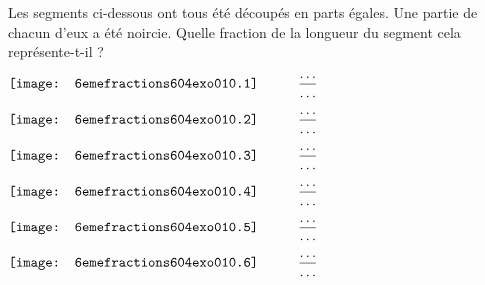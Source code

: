 Les segments ci-dessous ont tous été découpés en parts égales. Une partie de chacun d'eux a été noircie. Quelle fraction de la longueur du segment cela représente-t-il ?
\begin{myenumerate}
\setlength{\baselineskip}{4\baselineskip}
  \begin{multicols}{2}
  \item$\texttt{[image: 6emefractions604exo010.1]}\kern1cm\dfrac\ldots\ldots$
  \item$\texttt{[image: 6emefractions604exo010.2]}\kern1cm\dfrac\ldots\ldots$
  \item$\texttt{[image: 6emefractions604exo010.3]}\kern1cm\dfrac\ldots\ldots$
  \item$\texttt{[image: 6emefractions604exo010.4]}\kern1cm\dfrac\ldots\ldots$
  \item$\texttt{[image: 6emefractions604exo010.5]}\kern1cm\dfrac\ldots\ldots$
  \item$\texttt{[image: 6emefractions604exo010.6]}\kern1cm\dfrac\ldots\ldots$    
  \end{multicols}
\end{myenumerate}